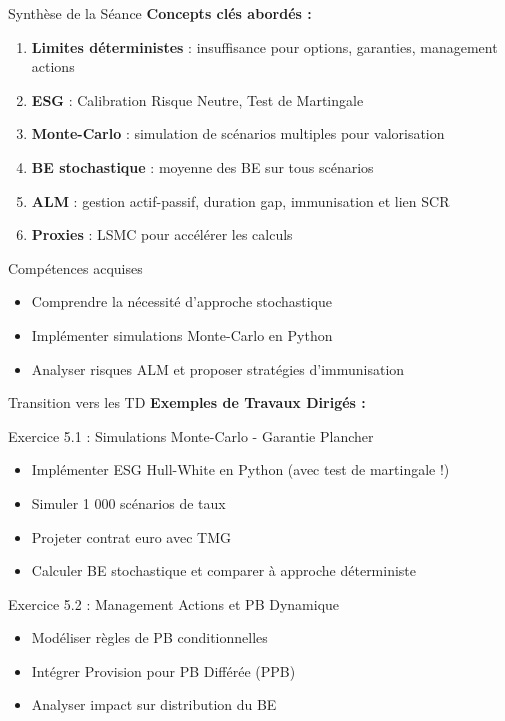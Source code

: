 \documentclass[10pt,aspectratio=169]{beamer}
\begin{document}
\begin{frame}{Synthèse de la Séance}
\textbf{Concepts clés abordés :}

\begin{enumerate}
    \item \textbf{Limites déterministes} : insuffisance pour options, garanties, management actions
    \item \textbf{ESG} : Calibration Risque Neutre, Test de Martingale
    \item \textbf{Monte-Carlo} : simulation de scénarios multiples pour valorisation
    \item \textbf{BE stochastique} : moyenne des BE sur tous scénarios
    \item \textbf{ALM} : gestion actif-passif, duration gap, immunisation et lien SCR
    \item \textbf{Proxies} : LSMC pour accélérer les calculs
\end{enumerate}

\vspace{0.3cm}
\begin{block}{Compétences acquises}
\begin{itemize}
    \item Comprendre la nécessité d'approche stochastique
    \item Implémenter simulations Monte-Carlo en Python
    \item Analyser risques ALM et proposer stratégies d'immunisation
\end{itemize}
\end{block}
\end{frame}

\begin{frame}{Transition vers les TD}
\textbf{Exemples de Travaux Dirigés :}

\begin{block}{Exercice 5.1 : Simulations Monte-Carlo - Garantie Plancher }
\begin{itemize}
    \item Implémenter ESG Hull-White en Python (avec test de martingale !)
    \item Simuler 1 000 scénarios de taux
    \item Projeter contrat euro avec TMG
    \item Calculer BE stochastique et comparer à approche déterministe
\end{itemize}
\end{block}

\begin{block}{Exercice 5.2 : Management Actions et PB Dynamique }
\begin{itemize}
    \item Modéliser règles de PB conditionnelles
    \item Intégrer Provision pour PB Différée (PPB)
    \item Analyser impact sur distribution du BE
\end{itemize}
\end{block}
\end{frame}
\end{document}
